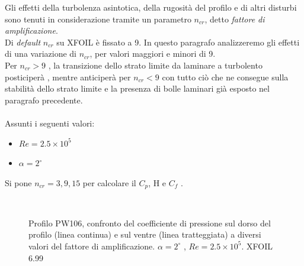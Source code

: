 Gli effetti della turbolenza asintotica, della rugosità del profilo e di altri disturbi sono tenuti in considerazione tramite un parametro $n_{cr}$, detto {\itshape fattore di amplificazione}.\\ Di {\itshape default} $n_{cr}$ su XFOIL è fissato a 9. In questo paragrafo analizzeremo gli effetti di una variazione di $n_{cr}$, per valori maggiori e minori di 9.\\
Per $n_{cr} > 9$ , la transizione dello strato limite da laminare a turbolento posticiperà , mentre anticiperà per $n_{cr} < 9$ con tutto ciò che ne consegue sulla stabilità dello strato limite e la presenza di bolle laminari già esposto nel paragrafo precedente.\\ \\
Assunti i seguenti valori:

\begin {itemize}
\item $Re=2.5\times10^5  $ 
\item $ \alpha=2^\circ$
\end{itemize}
\noindent 
Si pone  $n_{cr}=3, 9, 15$ per calcolare il $C_p$, H e $C_f$ .

\noindent \\

\begin{figure} [H]
\centering
{}
\caption{\footnotesize Profilo PW106, confronto del coefficiente di pressione sul dorso del profilo (linea continua) e sul ventre (linea tratteggiata) a diversi valori del fattore di amplificazione.  $ \alpha=2^\circ$ , $ Re= 2.5\times10^5$. XFOIL 6.99}\label{fig:n}
\end{figure}

